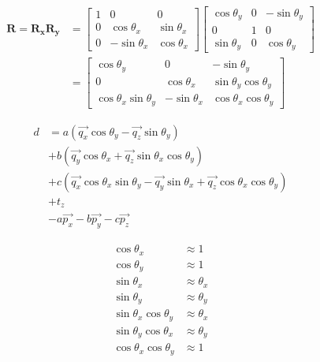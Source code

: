 \documentclass[a4paper,10pt]{scrreprt}
\newcommand{\matr}[1]{\mathbf{#1}}
\begin{document}
\begin{equation}
\begin{aligned}
	\matr{R} = \matr{R_x} \matr{R_y} & = \left[ \begin{matrix}
		1 & 0 & 0 \\
		0 & \cos \theta_x & \sin \theta_x \\
		0 & - \sin \theta_x & \cos \theta_x
	\end{matrix} \right] \left[ \begin{matrix}
		\cos \theta_y & 0 & - \sin \theta_y \\
		0 & 1 & 0 \\
		\sin \theta_y & 0 & \cos \theta_y
	\end{matrix} \right] \\
	& = \left[ \begin{matrix}
		\cos \theta_y & 0 & - \sin \theta_y \\
		0 & \cos \theta_x & \sin \theta_y \cos \theta_y \\
		\cos \theta_x \sin \theta_y & - \sin \theta_x & \cos \theta_x \cos \theta_y
	\end{matrix} \right]
\end{aligned}
\end{equation}


\begin{equation}
\begin{aligned}
	d & = a (\vec{q_x} \cos \theta_y - \vec{q_z} \sin \theta_y) \\
	& + b (\vec{q_y} \cos \theta_x + \vec{q_z} \sin \theta_x \cos \theta_y) \\
	& + c (\vec{q_x} \cos \theta_x \sin \theta_y - \vec{q_y} \sin \theta_x + \vec{q_z} \cos \theta_x \cos \theta_y) \\
	& + t_z \\
	& - a \vec{p_x} - b \vec{p_y} - c \vec{p_z}
\end{aligned}
\end{equation}


\begin{equation}
\begin{aligned}
	\cos \theta_x & \approx 1 \\
	\cos \theta_y & \approx 1 \\
	\sin \theta_x & \approx \theta_x \\
	\sin \theta_y & \approx \theta_y \\
	\sin \theta_x \cos \theta_y & \approx \theta_x \\
	\sin \theta_y \cos \theta_x & \approx \theta_y \\
	\cos \theta_x \cos \theta_y & \approx 1
\end{aligned}
\end{equation}
\end{document}
